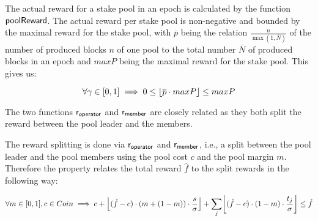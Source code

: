 \begin{property}
  \label{prop:actual-reward}

  The actual reward for a stake pool in an epoch is calculated by the function
  $\fun{poolReward}$. The actual reward per stake pool is non-negative and
  bounded by the maximal reward for the stake pool, with $\overline{p}$ being
  the relation $\frac{n}{\max(1, \overline{N})}$ of the number of produced
  blocks $n$ of one pool to the total number $\overline{N}$ of produced blocks
  in an epoch and $maxP$ being the maximal reward for the stake pool. This gives
  us:

  \begin{equation*}
    \forall \gamma \in [0,1] \implies 0\leq \floor*{\overline{p}\cdot maxP} \leq maxP
  \end{equation*}
\end{property}

The two functions $\fun{r_{operator}}$ and $\fun{r_{member}}$ are closely related as
they both split the reward between the pool leader and the members.

\begin{property}
  \label{prop:reward-splitting}

  The reward splitting is done via $\fun{r_{operator}}$ and $\fun{r_{member}}$, i.e.,
  a split between the pool leader and the pool members using the pool cost $c$
  and the pool margin $m$. Therefore the property relates the total reward
  $\hat{f}$ to the split rewards in the following way:

  \begin{multline*}
    \forall m\in [0,1], c\in Coin \implies c + \floor*{(\hat{f} - c)\cdot (m +
      (1 - m)) \cdot \frac{s}{\sigma}} + \sum_{j}\floor*{(\hat{f} -
      c)\cdot(1-m)\cdot\frac{t_{j}}{\sigma}} \leq \hat{f}
  \end{multline*}

\end{property}

\clearpage

